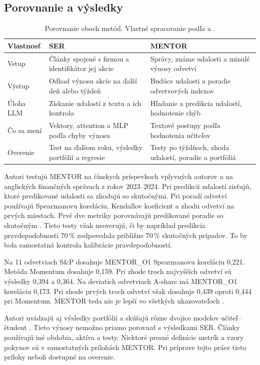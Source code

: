 \subsection{Porovnanie a výsledky}
\begin{table}[H]
\centering
\caption{Porovnanie oboch metód. Vlastné spracovanie podľa  a .}
\label{tab:comparison}
\small
\begin{tabularx}{\textwidth}{@{}p{2.35cm}YY@{}}
\toprule
Vlastnosť & SER & MENTOR\\
\midrule
Vstup & Články spojené s firmou a identifikátor jej akcie & Správy, známe udalosti a minulé výnosy odvetví\\
Výstup & Odhad výnosu akcie na ďalší deň alebo týždeň & Budúce udalosti a poradie odvetvových indexov\\
Úloha LLM & Získanie udalostí z textu a ich kontrola & Hľadanie a predikcia udalostí, hodnotenie chýb\\
Čo sa mení & Vektory, attention a MLP podľa chyby výnosu & Textové postupy podľa hodnotenia učiteľov\\
Overenie & Test na ďalšom roku, výsledky portfólií a regresie & Testy po týždňoch, zhoda udalostí, poradie a portfóliá\\
\bottomrule
\end{tabularx}
\end{table}

Autori testujú MENTOR na čínskych príspevkoch vplyvných autorov a na anglických finančných správach z rokov 2023--2024. Pri predikcii udalostí zisťujú, ktoré predikované udalosti sa zhodujú so skutočnými. Pri poradí odvetví používajú Spearmanovu koreláciu, Kendallov koeficient a zhodu odvetví na prvých miestach. Prvé dve metriky porovnávajú predikované poradie so skutočným . Tieto testy však neoverujú, či by napríklad predikcia pravdepodobnosti 70\,\% zodpovedala približne 70\,\% skutočných prípadov. To by bola samostatná kontrola kalibrácie pravdepodobností.

Na 11 odvetviach S\&P dosahuje MENTOR\_O1 Spearmanovu koreláciu 0,221. Metóda Momentum dosahuje 0,159. Pri zhode troch najvyšších odvetví sú výsledky 0,394 a 0,364. Na deviatich odvetviach A-share má MENTOR\_O1 koreláciu 0,173. Pri zhode prvých troch odvetví však dosahuje 0,439 oproti 0,444 pri Momentum. MENTOR teda nie je lepší vo všetkých ukazovateľoch .

Autori uvádzajú aj výsledky portfólií a skúšajú rôzne dvojice modelov učiteľ--študent . Tieto výnosy nemožno priamo porovnať s výsledkami SER. Články používajú iné obdobia, aktíva a testy. Niektoré presné definície metrík a vzory pokynov sú v samostatných prílohách MENTOR. Pri príprave tejto práce tieto prílohy neboli dostupné na overenie.
